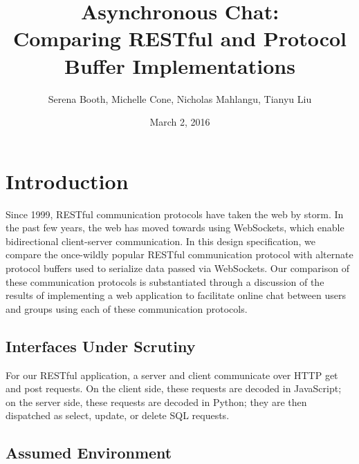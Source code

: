 \documentclass[11pt]{article} %
\title{Asynchronous Chat: \\ Comparing RESTful and Protocol Buffer Implementations}
\author{Serena Booth, Michelle Cone, Nicholas Mahlangu, Tianyu Liu}
\date{March 2, 2016} %
\begin{document}
\maketitle


\section{Introduction}

Since 1999, RESTful communication protocols have taken the web by storm. In the past few years, the web has moved towards using WebSockets, which enable bidirectional client-server communication. In this design specification, we compare the once-wildly popular RESTful communication protocol with alternate protocol buffers used to serialize data passed via WebSockets. Our comparison of these communication protocols is substantiated through a discussion of the results of implementing a web application to facilitate online chat between users and groups using each of these communication protocols. 


\subsection{Interfaces Under Scrutiny}

For our RESTful application, a server and client communicate over HTTP get and post requests. On the client side, these requests are decoded in JavaScript; on the server side, these requests are decoded in Python; they are then dispatched as select, update, or delete SQL requests. 

\subsection{Assumed Environment}
\end{document}
